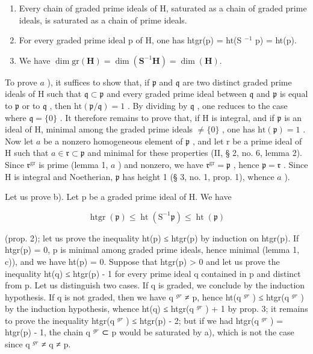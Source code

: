 \begin{enumerate}
\def\labelenumi{\alph{enumi})}
\item
  Every chain of graded prime ideals of H, saturated as a chain of graded prime ideals, is saturated as a chain of prime ideals.
\item
  For every graded prime ideal p of H, one has htgr(p) = ht(S \(^{-1}\) p) = ht(p).
\item
  We have \(\dim \mathrm{gr}(\mathbf{H}) = \dim (\mathbf{S}^{-1}\mathbf{H}) = \dim (\mathbf{H}).\)
\end{enumerate}

To prove \(a\) ), it suffices to show that, if \(\mathfrak{p}\) and \(\mathfrak{q}\) are two distinct graded prime ideals of H such that \(\mathfrak{q} \subset \mathfrak{p}\) and every graded prime ideal between \(\mathfrak{q}\) and \(\mathfrak{p}\) is equal to \(\mathfrak{p}\) or to \(\mathfrak{q}\) , then \(\mathrm{ht}(\mathfrak{p}/\mathfrak{q}) = 1\) . By dividing by \(\mathfrak{q}\) , one reduces to the case where \(\mathfrak{q} = \{0\}\) . It therefore remains to prove that, if H is integral, and if \(\mathfrak{p}\) is an ideal of H, minimal among the graded prime ideals \(\neq \{0\}\) , one has \(\mathrm{ht}(\mathfrak{p}) = 1\) . Now let \(a\) be a nonzero homogeneous element of \(\mathfrak{p}\) , and let r be a prime ideal of H such that \(a \in \mathfrak{r} \subset \mathfrak{p}\) and minimal for these properties (II, § 2, no. 6, lemma 2). Since \(\mathfrak{r}^{\mathrm{gr}}\) is prime (lemma 1, \(a\) ) and nonzero, we have \(\mathfrak{r}^{\mathrm{gr}} = \mathfrak{p}\) , hence \(\mathfrak{p} = \mathfrak{r}\) . Since H is integral and Noetherian, \(\mathfrak{p}\) has height 1 (§ 3, no. 1, prop. 1), whence \(a\) ).

Let us prove b). Let p be a graded prime ideal of H. We have

\[
\operatorname{htgr} (\mathfrak {p}) \leqslant \operatorname{ht} \left(\mathrm{S} ^ {- 1} \mathfrak {p}\right) \leqslant \operatorname{ht} (\mathfrak {p})
\]

(prop. 2); let us prove the inequality ht(p) ≤ htgr(p) by induction on htgr(p). If htgr(p) = 0, p is minimal among graded prime ideals, hence minimal (lemma 1, c)), and we have ht(p) = 0. Suppose that htgr(p) \textgreater{} 0 and let us prove the inequality ht(q) ≤ htgr(p) - 1 for every prime ideal q contained in p and distinct from p. Let us distinguish two cases. If q is graded, we conclude by the induction hypothesis. If q is not graded, then we have q \(^{gr}\) ≠ p, hence ht(q \(^{gr}\) ) ≤ htgr(q \(^{gr}\) ) by the induction hypothesis, whence ht(q) ≤ htgr(q \(^{gr}\) ) + 1 by prop. 3; it remains to prove the inequality htgr(q \(^{gr}\) ) ≤ htgr(p) - 2; but if we had htgr(q \(^{gr}\) ) = htgr(p) - 1, the chain q \(^{gr}\) ⊂ p would be saturated by a), which is not the case since q \(^{gr}\) ≠ q ≠ p.

